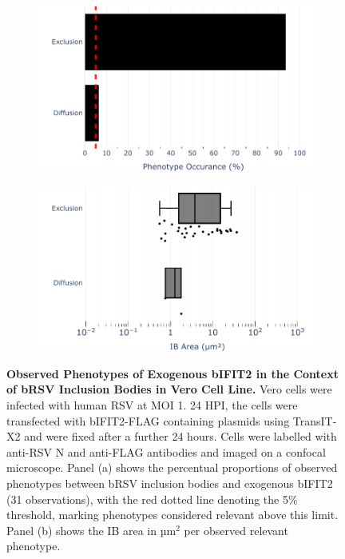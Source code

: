 \begin{figure}
    \begin{subfigure}{0.495\textwidth}
        \caption{}
        \includegraphics[width=1\linewidth]{09. Chapter 4/Figs/02. Overexpression/02. IFIT2/07. bar_bi2f_brsv.pdf} 
    \end{subfigure}
    \begin{subfigure}{0.495\textwidth}
        \caption{}
        \includegraphics[width=1\linewidth]{09. Chapter 4/Figs/02. Overexpression/02. IFIT2/08. box_bi2f_brsv.pdf}
    \end{subfigure}
    \caption[Observed Phenotypes of Exogenous bIFIT2 in the Context of bRSV Inclusion Bodies in Vero Cell Line.]{\textbf{Observed Phenotypes of Exogenous bIFIT2 in the Context of bRSV Inclusion Bodies in Vero Cell Line.} Vero cells were infected with human RSV at MOI 1. 24 HPI, the cells were transfected with bIFIT2-FLAG containing plasmids using TransIT-X2 and were fixed after a further 24 hours. Cells were labelled with anti-RSV N and anti-FLAG antibodies and imaged on a confocal microscope. Panel (a) shows the percentual proportions of observed phenotypes between bRSV inclusion bodies and exogenous bIFIT2 (31 observations), with the red dotted line denoting the 5\% threshold, marking phenotypes considered relevant above this limit. Panel (b) shows the IB area in \(\mbox{µm}^2\) per observed relevant phenotype.}
    \label{fig:Observed Phenotypes of Exogenous bIFIT2 in the Context of bRSV Inclusion Bodies in Vero Cell Line}
\end{figure}

